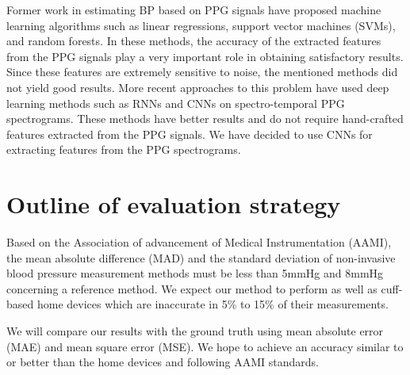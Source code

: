 \documentclass[12pt]{extarticle}
\begin{document}
Former work in estimating BP based on PPG signals have proposed machine learning algorithms such as linear regressions, support vector machines (SVMs), and random forests. In these methods, the accuracy of the extracted features from the PPG signals play a very important role in obtaining satisfactory results. Since these features are extremely sensitive to noise, the mentioned methods did not yield good results. More recent approaches to this problem have used deep learning methods such as RNNs and CNNs on spectro-temporal PPG spectrograms. These methods have better results and do not require hand-crafted features extracted from the PPG signals. We have decided to use CNNs for extracting features from the PPG spectrograms.\\
\vspace{-5pt}




\section*{Outline of evaluation strategy}

Based on the Association of advancement of Medical Instrumentation (AAMI), the mean absolute difference (MAD) and the standard deviation of non-invasive blood pressure measurement methods must be less than 5mmHg and 8mmHg concerning a reference method\cite{3}. We expect our method to perform as well as cuff-based home devices which are inaccurate in 5\% to 15\% of their measurements\cite{4, 5}.\\
\vspace{-5pt}

We will compare our results with the ground truth using mean absolute error (MAE) and mean square error (MSE). We hope to achieve an accuracy similar to or better than the home devices and following AAMI standards.



\end{document}
